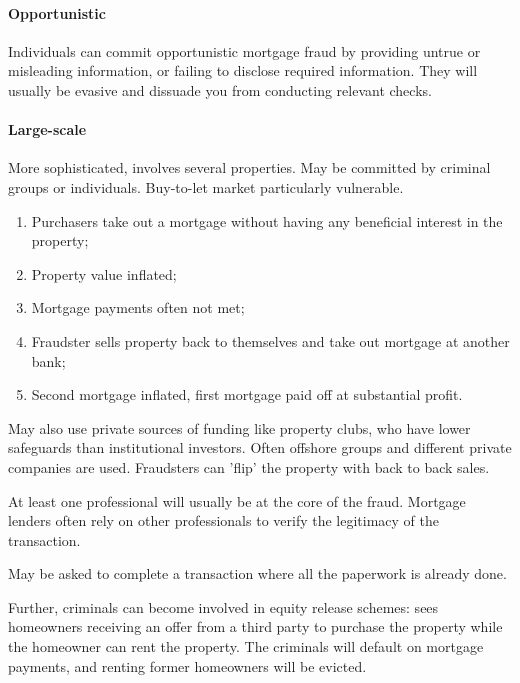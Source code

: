 \documentclass[
]{article}
\providecommand{\tightlist}{%
  \setlength{\itemsep}{0pt}\setlength{\parskip}{0pt}}
\begin{document}
\hypertarget{opportunistic}{%
\paragraph{Opportunistic}\label{opportunistic}}

Individuals can commit opportunistic mortgage fraud by providing untrue
or misleading information, or failing to disclose required information.
They will usually be evasive and dissuade you from conducting relevant
checks.

\hypertarget{large-scale}{%
\paragraph{Large-scale}\label{large-scale}}

More sophisticated, involves several properties. May be committed by
criminal groups or individuals. Buy-to-let market particularly
vulnerable.

\begin{enumerate}
\tightlist
\item
  Purchasers take out a mortgage without having any beneficial interest
  in the property;
\item
  Property value inflated;
\item
  Mortgage payments often not met;
\item
  Fraudster sells property back to themselves and take out mortgage at
  another bank;
\item
  Second mortgage inflated, first mortgage paid off at substantial
  profit.
\end{enumerate}

May also use private sources of funding like property clubs, who have
lower safeguards than institutional investors. Often offshore groups and
different private companies are used. Fraudsters can 'flip' the property
with back to back sales.

At least one professional will usually be at the core of the fraud.
Mortgage lenders often rely on other professionals to verify the
legitimacy of the transaction.

May be asked to complete a transaction where all the paperwork is
already done.

Further, criminals can become involved in equity release schemes: sees
homeowners receiving an offer from a third party to purchase the
property while the homeowner can rent the property. The criminals will
default on mortgage payments, and renting former homeowners will be
evicted.
\end{document}
